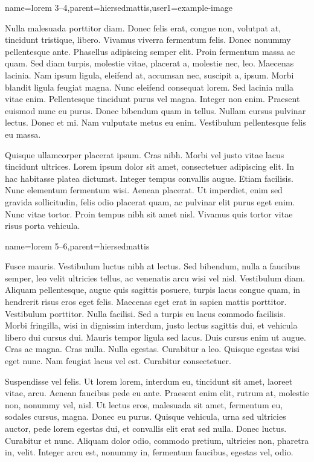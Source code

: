 {name={lorem 3--4},parent={hiersedmattis},user1={example-image}}%
{%
Nulla malesuada porttitor diam. Donec felis erat, congue non,
volutpat at, tincidunt tristique, libero.  Vivamus viverra fermentum
felis. Donec nonummy pellentesque ante.  Phasellus adipiscing semper
elit. Proin fermentum massa ac quam. Sed diam turpis, molestie
vitae, placerat a, molestie nec, leo. Maecenas lacinia. Nam ipsum
ligula, eleifend at, accumsan nec, suscipit a, ipsum. Morbi blandit
ligula feugiat magna. Nunc eleifend consequat lorem. Sed lacinia
nulla vitae enim. Pellentesque tincidunt purus vel magna. Integer
non enim. Praesent euismod nunc eu purus. Donec bibendum quam in
tellus. Nullam cursus pulvinar lectus. Donec et mi.  Nam vulputate
metus eu enim. Vestibulum pellentesque felis eu massa.

Quisque ullamcorper placerat ipsum. Cras nibh.  Morbi vel justo
vitae lacus tincidunt ultrices. Lorem ipsum dolor sit amet,
consectetuer adipiscing elit. In hac habitasse platea dictumst.
Integer tempus convallis augue. Etiam facilisis. Nunc elementum
fermentum wisi. Aenean placerat. Ut imperdiet, enim sed gravida
sollicitudin, felis odio placerat quam, ac pulvinar elit purus eget
enim. Nunc vitae tortor. Proin tempus nibh sit amet nisl.  Vivamus
quis tortor vitae risus porta vehicula.%
}

{name={lorem 5--6},parent={hiersedmattis}}%
{%
Fusce mauris. Vestibulum luctus nibh at lectus.  Sed bibendum, nulla
a faucibus semper, leo velit ultricies tellus, ac venenatis arcu
wisi vel nisl. Vestibulum diam. Aliquam pellentesque, augue quis
sagittis posuere, turpis lacus congue quam, in hendrerit risus eros
eget felis. Maecenas eget erat in sapien mattis porttitor.
Vestibulum porttitor. Nulla facilisi. Sed a turpis eu lacus commodo
facilisis. Morbi fringilla, wisi in dignissim interdum, justo lectus
sagittis dui, et vehicula libero dui cursus dui. Mauris tempor
ligula sed lacus. Duis cursus enim ut augue.  Cras ac magna. Cras
nulla. Nulla egestas. Curabitur a leo. Quisque egestas wisi eget
nunc. Nam feugiat lacus vel est. Curabitur consectetuer.%

Suspendisse vel felis. Ut lorem lorem, interdum eu, tincidunt sit
amet, laoreet vitae, arcu. Aenean faucibus pede eu ante. Praesent
enim elit, rutrum at, molestie non, nonummy vel, nisl. Ut lectus
eros, malesuada sit amet, fermentum eu, sodales cursus, magna. Donec
eu purus. Quisque vehicula, urna sed ultricies auctor, pede lorem
egestas dui, et convallis elit erat sed nulla.  Donec luctus.
Curabitur et nunc. Aliquam dolor odio, commodo pretium, ultricies
non, pharetra in, velit. Integer arcu est, nonummy in, fermentum
faucibus, egestas vel, odio.%
}

